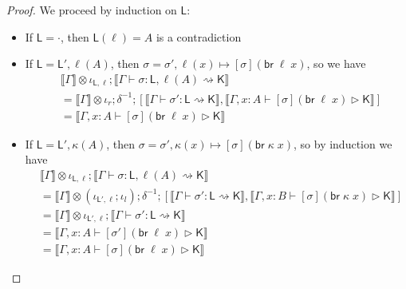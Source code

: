 \documentclass[acmsmall,screen,review]{acmart}
\newcommand{\ms}[1]{\ensuremath{\mathsf{#1}}}
\newcommand{\brb}[2]{\ms{br}\;#1\;#2}
\newcommand{\bhyp}[2]{#1 : #2}
\newcommand{\haslb}[3]{#1 \vdash #2 \rhd #3}
\newcommand{\lbsubst}[4]{#1 \vdash #2: #3 \rightsquigarrow #4}
\newcommand{\dnt}[1]{\llbracket{#1}\rrbracket}
\begin{document}
\begin{proof}
  We proceed by induction on $\ms{L}$:
  \begin{itemize}[leftmargin=*]
    \item If $\ms{L} = \cdot$, then $\ms{L}(\ell) = A$ is a contradiction
    \item If $\ms{L} = \ms{L}', \ell(A)$, then 
    $\sigma = \sigma', \ell(x) \mapsto [\sigma](\brb{\ell}{x})$, so we have
    \begin{equation}
      \begin{aligned}
      & \dnt{\Gamma} \otimes \iota_{\ms{L}, \ell} 
        ; \dnt{\lbsubst{\Gamma}{\sigma}{\ms{L}, \ell(A)}{\ms{K}}} \\
      & = \dnt{\Gamma} \otimes \iota_r ; \delta^{-1} ; [
          \dnt{\lbsubst{\Gamma}{\sigma'}{\ms{L}}{\ms{K}}},
          \dnt{\haslb{\Gamma, \bhyp{x}{A}}{[\sigma](\brb{\ell}{x})}{\ms{K}}}
        ] \\
      & = \dnt{\haslb{\Gamma, \bhyp{x}{A}}{[\sigma](\brb{\ell}{x})}{\ms{K}}}
      \end{aligned}
    \end{equation}
    \item If $\ms{L} = \ms{L}', \kappa(A)$, then 
    $\sigma = \sigma', \kappa(x) \mapsto [\sigma](\brb{\kappa}{x})$, so by
    induction we have
    \begin{equation}
      \begin{aligned}
      & \dnt{\Gamma} \otimes \iota_{\ms{L}, \ell} 
        ; \dnt{\lbsubst{\Gamma}{\sigma}{\ms{L}, \ell(A)}{\ms{K}}} \\
      & = \dnt{\Gamma} \otimes (\iota_{\ms{L}', \ell} ; \iota_l) ; \delta^{-1} ; [
          \dnt{\lbsubst{\Gamma}{\sigma'}{\ms{L}}{\ms{K}}},
          \dnt{\haslb{\Gamma, \bhyp{x}{B}}{[\sigma](\brb{\kappa}{x})}{\ms{K}}}
        ] \\
      & = \dnt{\Gamma} \otimes \iota_{\ms{L}', \ell} 
        ; \dnt{\lbsubst{\Gamma}{\sigma'}{\ms{L}}{\ms{K}}} \\
      & = \dnt{\haslb{\Gamma, \bhyp{x}{A}}{[\sigma'](\brb{\ell}{x})}{\ms{K}}} \\
      & = \dnt{\haslb{\Gamma, \bhyp{x}{A}}{[\sigma](\brb{\ell}{x})}{\ms{K}}}
      \end{aligned}
    \end{equation}
  \end{itemize}
\end{proof}
\end{document}
